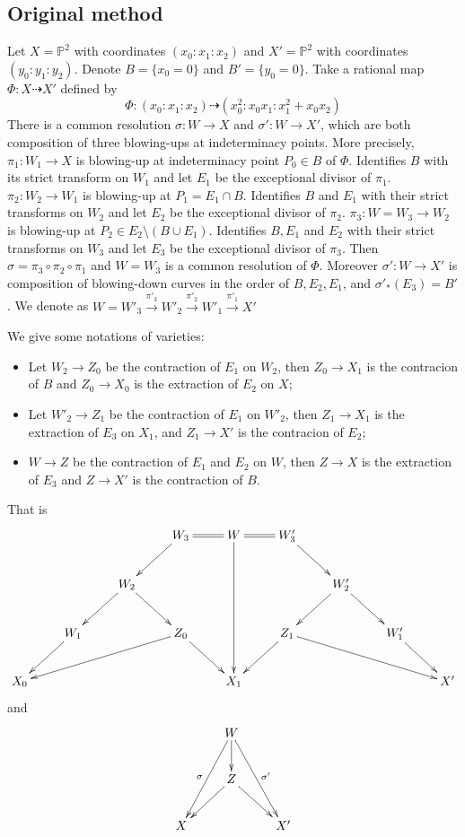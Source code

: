 \documentclass[11pt]{amsart}
\begin{document}
\subsection{Original method}\label{example1}
Let $ X=\mathbb{P}^2 $ with coordinates $ (x_0:x_1:x_2) $ and $ X'=\mathbb{P}^2 $ with coordinates $ (y_0:y_1:y_2) $.
Denote $ B=\{x_0=0\} $ and $B'=\{y_{0}=0\} $.
Take a rational map $ \Phi:X\dashrightarrow X' $ defined by 
\[ \Phi:(x_0:x_1:x_2)\dashrightarrow (x_0^2:x_0x_1:x_1^2+x_0x_2) \]
There is a  common resolution $\sigma:W\to X$ and $\sigma':W\to X'$, which are both composition of three blowing-ups at indeterminacy points.
More precisely, $\pi_{1}:W_{1}\to X$ is blowing-up at indeterminacy point $P_{0} \in B$ of $\Phi$. Identifies $B$ with its strict transform on $W_{1}$ and let $E_{1}$ be the exceptional divisor of $\pi_{1}$.
$\pi_{2}:W_{2}\to W_{1}$ is blowing-up at $P_{1}=E_{1} \cap B$. Identifies  $B$ and $E_{1}$ with their strict transforms on $W_{2}$ and let $E_{2}$ be the exceptional divisor of $\pi_{2}$.
$\pi_{3}:W=W_{3}\to W_{2}$ is blowing-up at $P_{2} \in E_{2} \setminus (B\cup E_{1})$. Identifies  $B, E_{1}$ and $E_{2}$ with their strict transforms   on $W_{3}$ and let $E_{3}$ be the exceptional divisor of $\pi_{3}$.
Then $ \sigma=\pi_{3}\circ \pi_{2} \circ \pi_{1} $ and $ W=W_3 $ is a common resolution of $\Phi$. Moreover $ \sigma':W\to X' $ is composition of blowing-down curves in the order of $ B,E_2,E_1 $, and $\sigma'_*(E_{3})=B'$. We denote as $W=W'_{3}\xrightarrow{\pi'_{3}} W'_{2}\xrightarrow{\pi'_{2}} W'_{1} \xrightarrow{\pi'_{1}} X'$

We give some notations of varieties:
\begin{itemize}
  \item Let $W_{2}\to Z_{0}$ be the contraction of $E_{1}$ on $W_{2}$, then $Z_{0} \to X_{1}$ is the contracion of $B$  and $Z_{0}\to X_{0}$ is the extraction of $E_{2}$ on $X$;
 \item Let $W'_{2}\to Z_{1}$ be the contraction of $E_{1}$ on $W'_{2}$, then $Z_{1} \to X_{1}$ is the extraction of $E_{3}$ on $X_{1}$, and $Z_{1}\to X'$ is the contracion of $E_{2}$;
 \item $W\to Z$ be the contraction of $E_{1}$ and $E_{2}$ on $W$, then $Z\to X$ is the extraction of $E_{3}$ and $Z\to X'$ is the contraction of $B$.
\end{itemize}
That is
    \[ \xymatrix{&&&W_3\ar[ld]\ar@{=}[r]&W\ar[ddd]\ar@{=}[r]&W_3'\ar[rd]\\
      &&W_2\ar[ld]\ar[rd]&&&&W_2'\ar[rd]\ar[dl]\\
      &W_1\ar[ld]&&Z_0\ar[llld]\ar[rd]&&Z_1\ar[ld]\ar[rrrd]&&W_1'\ar[rd]\\
      X_0&&&&X_1&&&&X'
    } \]
    and 
    \[\xymatrix{
      &W\ar[d]\ar[ddl]_{\sigma}\ar[ddr]^{\sigma'}&\\
      &Z\ar[dl]\ar[dr]\\
      X&&X' }  \]
    
\end{document}
